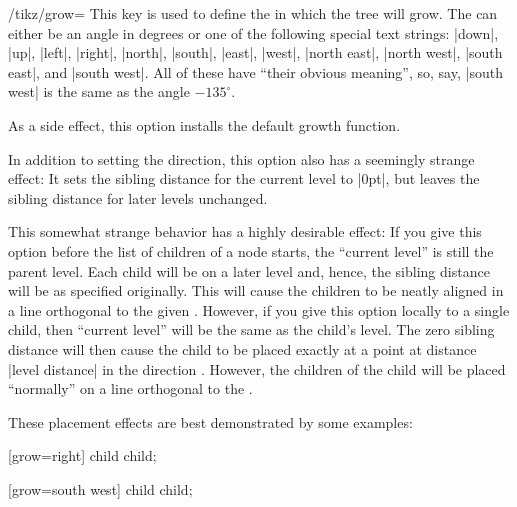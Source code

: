 \begin{key}{/tikz/grow=}
    This key is used to define the  in which the tree will
    grow. The  can either be an angle in degrees or one of the
    following special text strings: |down|, |up|, |left|, |right|, |north|,
    |south|, |east|, |west|, |north east|, |north west|, |south east|, and
    |south west|. All of these have ``their obvious meaning'', so, say,
    |south west| is the same as the angle $-135^\circ$.

    As a side effect, this option installs the default growth function.

    In addition to setting the direction, this option also has a seemingly
    strange effect: It sets the sibling distance for the current level to
    |0pt|, but leaves the sibling distance for later levels unchanged.

    This somewhat strange behavior has a highly desirable effect: If you give
    this option before the list of children of a node starts, the ``current
    level'' is still the parent level. Each child will be on a later level and,
    hence, the sibling distance will be as specified originally. This will
    cause the children to be neatly aligned in a line orthogonal to the given
    . However, if you give this option locally to a single
    child, then ``current level'' will be the same as the child's level. The
    zero sibling distance will then cause the child to be placed exactly at a
    point at distance |level distance| in the direction .
    However, the children of the child will be placed ``normally'' on a line
    orthogonal to the .

    These placement effects are best demonstrated by some examples:
\begin{codeexample}[]
\tikz {} [grow=right] child child;
\end{codeexample}

\begin{codeexample}[]
\tikz {} [grow=south west] child child;
\end{codeexample}

\begin{codeexample}[]
\end{codeexample}


\end{key}

